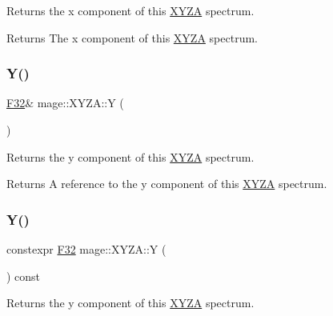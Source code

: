 Returns the x component of this \mbox{\hyperlink{structmage_1_1_x_y_z_a}{X\+Y\+ZA}} spectrum.

\begin{DoxyReturn}{Returns}
The x component of this \mbox{\hyperlink{structmage_1_1_x_y_z_a}{X\+Y\+ZA}} spectrum. 
\end{DoxyReturn}
\mbox{\label{structmage_1_1_x_y_z_a_ad0bbe584ccf93f9b2d5b000c0edc9f54}} 
\subsubsection{\texorpdfstring{Y()}{Y()}\hspace{0.1cm}{\footnotesize\ttfamily [1/2]}}
{\footnotesize\ttfamily \mbox{\hyperlink{namespacemage_aa97e833b45f06d60a0a9c4fc22ae02c0}{F32}}\& mage\+::\+X\+Y\+Z\+A\+::Y (\begin{DoxyParamCaption}{ }\end{DoxyParamCaption})\hspace{0.3cm}{\ttfamily [noexcept]}}

Returns the y component of this \mbox{\hyperlink{structmage_1_1_x_y_z_a}{X\+Y\+ZA}} spectrum.

\begin{DoxyReturn}{Returns}
A reference to the y component of this \mbox{\hyperlink{structmage_1_1_x_y_z_a}{X\+Y\+ZA}} spectrum. 
\end{DoxyReturn}
\mbox{\label{structmage_1_1_x_y_z_a_a3d3769694e1ea68766c83917be2f020e}} 
\subsubsection{\texorpdfstring{Y()}{Y()}\hspace{0.1cm}{\footnotesize\ttfamily [2/2]}}
{\footnotesize\ttfamily constexpr \mbox{\hyperlink{namespacemage_aa97e833b45f06d60a0a9c4fc22ae02c0}{F32}} mage\+::\+X\+Y\+Z\+A\+::Y (\begin{DoxyParamCaption}{ }\end{DoxyParamCaption}) const\hspace{0.3cm}{\ttfamily [noexcept]}}

Returns the y component of this \mbox{\hyperlink{structmage_1_1_x_y_z_a}{X\+Y\+ZA}} spectrum.

